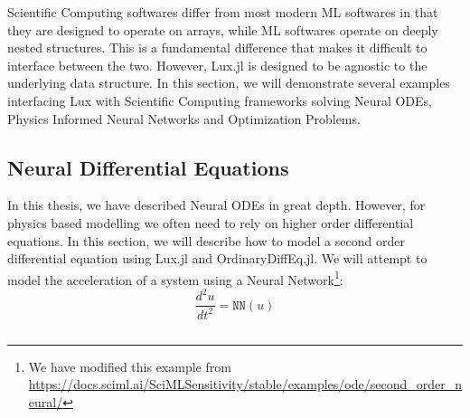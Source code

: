Scientific Computing softwares differ from most modern ML softwares in that they are designed to operate on arrays, while ML softwares operate on deeply nested structures. This is a fundamental difference that makes it difficult to interface between the two. However, Lux.jl is designed to be agnostic to the underlying data structure. In this section, we will demonstrate several examples interfacing Lux with Scientific Computing frameworks solving Neural ODEs, Physics Informed Neural Networks and Optimization Problems.

\subsection{Neural Differential Equations}
\label{subsec:differential_equations_lux}

In this thesis, we have described Neural ODEs in great depth. However, for physics based modelling we often need to rely on higher order differential equations. In this section, we will describe how to model a second order differential equation using Lux.jl and OrdinaryDiffEq.jl. We will attempt to model the acceleration of a system using a Neural Network\footnote{We have modified this example from \url{https://docs.sciml.ai/SciMLSensitivity/stable/examples/ode/second_order_neural/}}:
%
\begin{equation}
  \frac{d^2u}{dt^2} = \texttt{NN}(u)
\end{equation}
%

\inputminted[linenos, breaklines, fontsize=\scriptsize, frame=single, framesep=10pt]{julia}{../code/diffeq.jl}

